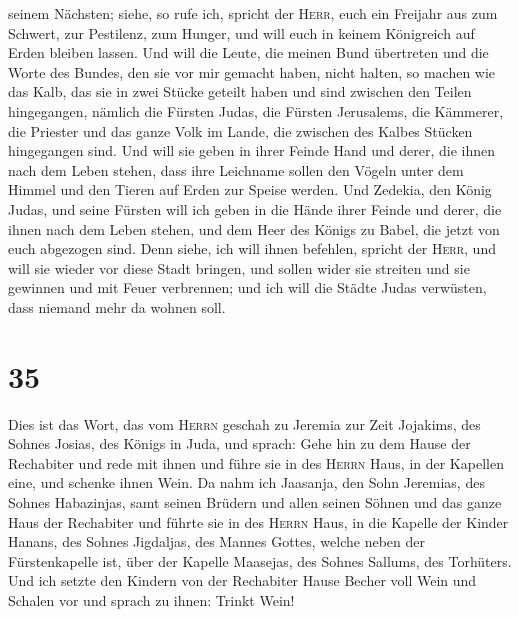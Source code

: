 seinem Nächsten; siehe, so rufe ich, spricht der \textsc{Herr}, euch ein
Freijahr aus zum Schwert, zur Pestilenz, zum Hunger, und will euch in
keinem Königreich auf Erden bleiben lassen.  Und will die
Leute, die meinen Bund übertreten und die Worte des Bundes, den sie vor
mir gemacht haben, nicht halten, so machen wie das Kalb, das sie in zwei
Stücke geteilt haben und sind zwischen den Teilen hingegangen,
 nämlich die Fürsten Judas, die Fürsten Jerusalems, die
Kämmerer, die Priester und das ganze Volk im Lande, die zwischen des
Kalbes Stücken hingegangen sind.  Und will sie geben in
ihrer Feinde Hand und derer, die ihnen nach dem Leben stehen, dass ihre
Leichname sollen den Vögeln unter dem Himmel und den Tieren auf Erden
zur Speise werden.  Und Zedekia, den König Judas, und
seine Fürsten will ich geben in die Hände ihrer Feinde und derer, die
ihnen nach dem Leben stehen, und dem Heer des Königs zu Babel, die jetzt
von euch abgezogen sind.  Denn siehe, ich will ihnen
befehlen, spricht der \textsc{Herr}, und will sie wieder vor diese Stadt
bringen, und sollen wider sie streiten und sie gewinnen und mit Feuer
verbrennen; und ich will die Städte Judas verwüsten, dass niemand mehr
da wohnen soll.

\hypertarget{section-34}{%
\section{35}\label{section-34}}

 Dies ist das Wort, das vom \textsc{Herrn} geschah zu
Jeremia zur Zeit Jojakims, des Sohnes Josias, des Königs in Juda, und
sprach:  Gehe hin zu dem Hause der Rechabiter und rede mit
ihnen und führe sie in des \textsc{Herrn} Haus, in der Kapellen eine,
und schenke ihnen Wein.  Da nahm ich Jaasanja, den Sohn
Jeremias, des Sohnes Habazinjas, samt seinen Brüdern und allen seinen
Söhnen und das ganze Haus der Rechabiter  und führte sie
in des \textsc{Herrn} Haus, in die Kapelle der Kinder Hanans, des Sohnes
Jigdaljas, des Mannes Gottes, welche neben der Fürstenkapelle ist, über
der Kapelle Maasejas, des Sohnes Sallums, des Torhüters. 
Und ich setzte den Kindern von der Rechabiter Hause Becher voll Wein und
Schalen vor und sprach zu ihnen: Trinkt Wein!

